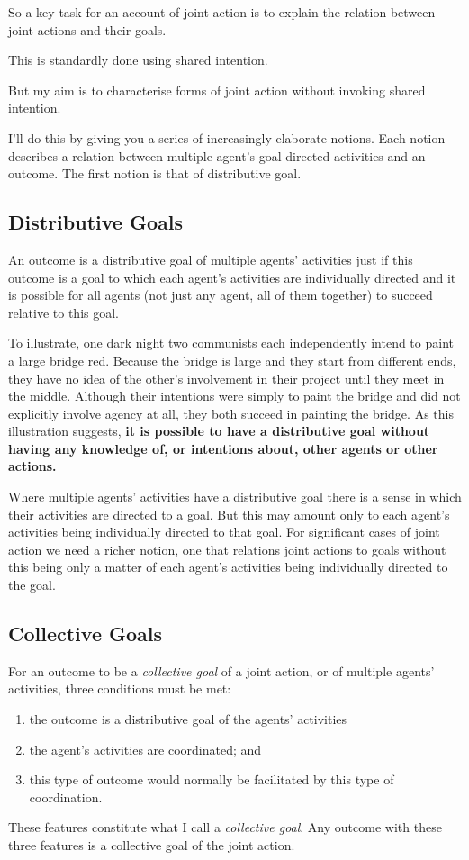 \documentclass[12pt,a4paper]{extarticle}
\begin{document}
So a key task for an account of joint action is to explain the relation between joint actions and their goals.

This is standardly done using shared intention.

But my aim is to characterise forms of joint action without invoking shared intention.

I'll do this by giving you a series of increasingly elaborate notions.  
Each notion describes a relation between multiple agent's goal-directed activities and an outcome.
The first notion is that of distributive goal.


\subsection{Distributive Goals}
An outcome is a distributive goal of multiple agents' activities just if this outcome is a goal to which each agent's activities are individually directed and it is possible for all agents (not just any agent, all of them together) to succeed relative to this goal.

To illustrate, one dark night two communists  each independently intend to paint a large bridge red.   
Because the bridge is large and they start from different ends, they have no idea of the other's involvement in their project until they meet in the middle.  
Although their intentions were simply to paint the bridge and did not explicitly involve agency at all, they both succeed in painting the bridge. 
As this illustration suggests, \textbf{it is possible to have a distributive goal without having any knowledge of, or intentions about, other agents or other actions.}

Where multiple agents' activities have a distributive goal there is a sense in which their activities are directed to a goal.  
But this may amount only to each agent's activities being individually directed to that goal.  
For significant cases of joint action we need a richer notion, one that relations joint actions to goals without this being only a matter of each agent's activities being individually directed to the goal.



\subsection{Collective Goals}
\label{section_collective}

For an outcome to be a \emph{collective goal} of a joint action, or of multiple agents' activities, three conditions must be met:
%
\begin{enumerate}
\item the outcome is a distributive goal of the agents' activities
\item the agent's activities are coordinated; and
\item this type of outcome would normally be facilitated by this type of coordination.
\end{enumerate}
%
These features constitute what I call a \emph{collective goal}.  Any outcome with these three features is a collective goal of the joint action.
\end{document}
